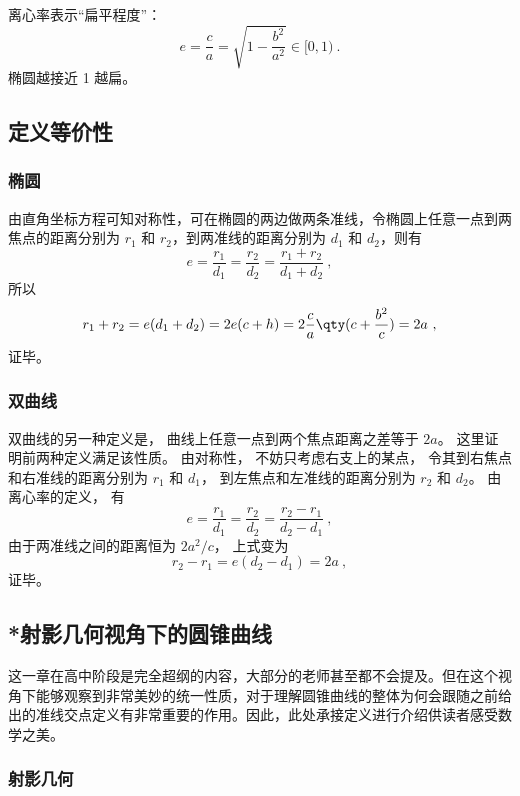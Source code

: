 离心率表示“扁平程度”：
$$ e = \frac{c}{a} = \sqrt{1 - \frac{b^2}{a^2}} \in [0, 1) ~.$$
椭圆越接近 1 越扁。

\subsection{定义等价性}

\subsubsection{椭圆}

由直角坐标方程可知对称性，可在椭圆的两边做两条准线，令椭圆上任意一点到两焦点的距离分别为 $r_1$ 和 $r_2$，到两准线的距离分别为 $d_1$ 和 $d_2$，则有
\begin{equation}
e = \frac{r_1}{d_1} = \frac{r_2}{d_2} = \frac{r_1 + r_2}{d_1 + d_2}~,
\end{equation}
所以
\begin{equation}
r_1 + r_2 = e(d_1+d_2) = 2e(c + h) = 2\frac{c}{a} \qty( c + \frac{b^2}{c} ) = 2a~,
\end{equation}
证毕。
\subsubsection{双曲线}
双曲线的另一种定义是， 曲线上任意一点到两个焦点距离之差等于 $2a$。 这里证明前两种定义满足该性质。 由对称性， 不妨只考虑右支上的某点， 令其到右焦点和右准线的距离分别为 $r_1$ 和 $d_1$， 到左焦点和左准线的距离分别为 $r_2$ 和 $d_2$。 由离心率的定义， 有
\begin{equation}
e = \frac{r_1}{d_1} = \frac{r_2}{d_2} = \frac{r_2 - r_1}{d_2 - d_1}~,
\end{equation}
由于两准线之间的距离恒为 $2a^2/c$， 上式变为
\begin{equation}
r_2 - r_1 = e(d_2 - d_1) = 2a~,
\end{equation}
证毕。

\subsection{*射影几何视角下的圆锥曲线}\label{sub_HsCsFD_1}

这一章在高中阶段是完全超纲的内容，大部分的老师甚至都不会提及。但在这个视角下能够观察到非常美妙的统一性质，对于理解圆锥曲线的整体为何会跟随之前给出的准线交点定义有非常重要的作用。因此，此处承接定义进行介绍供读者感受数学之美。


\subsubsection{射影几何}




